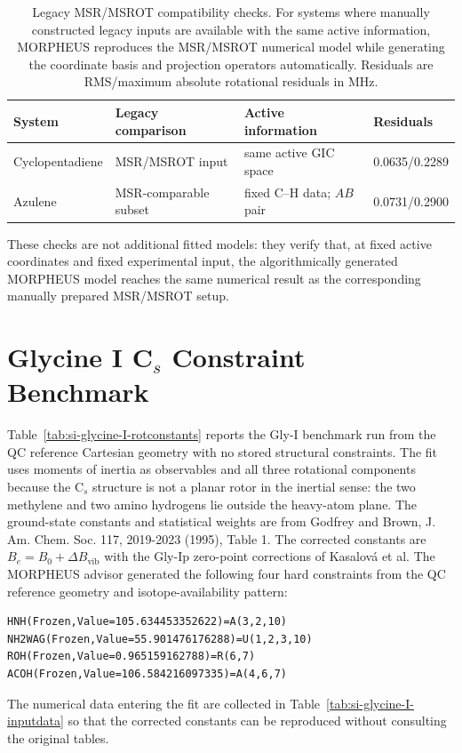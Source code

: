 \documentclass[12pt]{article}
\begin{document}
\clearpage

\begin{table}
\caption{Legacy MSR/MSROT compatibility checks. For systems where manually
constructed legacy inputs are available with the same active information,
MORPHEUS reproduces the MSR/MSROT numerical model while generating the
coordinate basis and projection operators automatically. Residuals are
RMS/maximum absolute rotational residuals in MHz.}
\label{tab:si-msrot-checks}
\footnotesize
\begin{tabular}{llll}
\toprule
System & Legacy comparison & Active information & Residuals \\
\midrule
Cyclopentadiene & MSR/MSROT input & same active GIC space & 0.0635/0.2289 \\
Azulene & MSR-comparable subset & fixed C--H data; $AB$ pair & 0.0731/0.2900 \\
\bottomrule
\end{tabular}
\end{table}

These checks are not additional fitted models: they verify that, at fixed
active coordinates and fixed experimental input, the algorithmically generated
MORPHEUS model reaches the same numerical result as the corresponding
manually prepared MSR/MSROT setup.

\section{\texorpdfstring{Glycine I C$_s$ Constraint Benchmark}{Glycine I Cs Constraint Benchmark}}

Table~\ref{tab:si-glycine-I-rotconstants} reports the Gly-I benchmark run from
the QC reference Cartesian geometry with no stored structural constraints. The fit uses
moments of inertia as observables and all three rotational components because
the C$_s$ structure is not a planar rotor in the inertial sense: the two
methylene and two amino hydrogens lie outside the heavy-atom plane. The
ground-state constants and statistical weights are from Godfrey and Brown,
J. Am. Chem. Soc. 117, 2019-2023 (1995), Table 1. The corrected constants are
$B_e=B_0+\Delta B_\mathrm{vib}$ with the Gly-Ip zero-point corrections of
Kasalov{\'a} et al. The MORPHEUS advisor generated the following four hard
constraints from the QC reference geometry and isotope-availability pattern:
\begin{verbatim}
HNH(Frozen,Value=105.634453352622)=A(3,2,10)
NH2WAG(Frozen,Value=55.901476176288)=U(1,2,3,10)
ROH(Frozen,Value=0.965159162788)=R(6,7)
ACOH(Frozen,Value=106.584216097335)=A(4,6,7)
\end{verbatim}
The numerical data entering the fit are collected in
Table~\ref{tab:si-glycine-I-inputdata} so that the corrected constants can be
reproduced without consulting the original tables.
\end{document}
